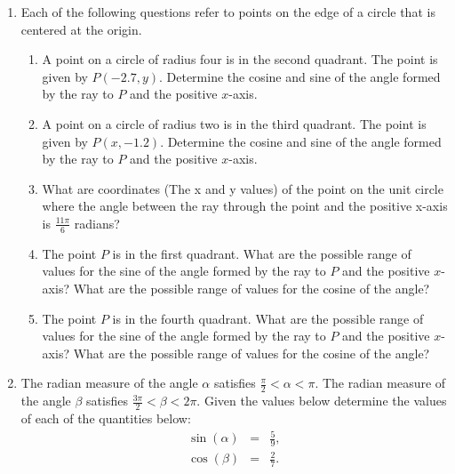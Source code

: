 \begin{enumerate}
\item Each of the following questions refer to points on the edge of a
  circle that is centered at the origin.
  \begin{enumerate}
  \item A point on a circle of radius four is in the second
    quadrant. The point is given by $P(-2.7, y)$. Determine the cosine
    and sine of the angle formed by the ray to $P$ and the positive
    $x$-axis.
  \item A point on a circle of radius two is in the third
    quadrant. The point is given by $P(x, -1.2)$. Determine the cosine
    and sine of the angle formed by the ray to $P$ and the positive
    $x$-axis.
  \item What are coordinates (The x and y values) of the point on the
    unit circle where the angle between the ray through the point and
    the positive x-axis is $\frac{11\pi}{6}$ radians?
  \item The point $P$ is in the first quadrant. What are the possible
    range of values for the sine of the angle formed by the ray to $P$
    and the positive $x$-axis? What are the possible range of values
    for the cosine of the angle?
  \item The point $P$ is in the fourth quadrant. What are the possible
    range of values for the sine of the angle formed by the ray to $P$
    and the positive $x$-axis? What are the possible range of values
    for the cosine of the angle?
  \end{enumerate}

\item The radian measure of the angle $\alpha$ satisfies
  $\frac{\pi}{2}<\alpha<\pi$. The radian measure of the angle $\beta$
  satisfies $\frac{3\pi}{2}<\beta<2\pi$.  Given the values below
  determine the values of each of the quantities below:
  \begin{eqnarray*}
    \sin(\alpha) & = & \frac{5}{9}, \\
    \cos(\beta)  & = & \frac{2}{7}.
  \end{eqnarray*}
  
  \begin{enumerate}
  \end{enumerate}


\end{enumerate}
